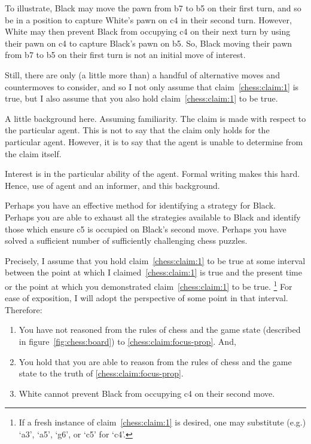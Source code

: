 \documentclass[10pt]{article}
\begin{document}
To illustrate, Black may move the pawn from b7 to b5 on their first turn, and so be in a position to capture White's pawn on c4 in their second turn.
However, White may then prevent Black from occupying c4 on their next turn by using their pawn on c4 to capture Black's pawn on b5.
So, Black moving their pawn from b7 to b5 on their first turn is not an initial move of interest.

Still, there are only (a little more than) a handful of alternative moves and countermoves to consider, and so I not only assume that claim~\ref{chess:claim:1} is true, but I also assume that you also hold claim~\ref{chess:claim:1} to be true.

\begin{note}
  A little background here.
  Assuming familiarity.
  The claim is made with respect to the particular agent.
  This is not to say that the claim only holds for the particular agent.
  However, it is to say that the agent is unable to determine from the claim itself.

  Interest is in the particular ability of the agent.
  Formal writing makes this hard.
  Hence, use of agent and an informer, and this background.
\end{note}

\begin{note}
  Perhaps you have an effective method for identifying a strategy for Black.
  Perhaps you are able to exhaust all the strategies available to Black and identify those which ensure c5 is occupied on Black's second move.
  Perhaps you have solved a sufficient number of sufficiently challenging chess puzzles.
\end{note}

Precisely, I assume that you hold claim~\ref{chess:claim:1} to be true at some interval between the point at which I claimed~\ref{chess:claim:1} is true and the present time or the point at which you demonstrated claim~\ref{chess:claim:1} to be true.\nolinebreak
\footnote{
  If a fresh instance of claim~\ref{chess:claim:1} is desired, one may substitute (e.g.) `a3', `a5', `g6', or `c5' for `c4'.
}
For ease of exposition, I will adopt the perspective of some point in that interval.
Therefore:
\begin{enumerate}[resume]
\item\label{chess:claim:no-reason} You have not reasoned from the rules of chess and the game state (described in figure~\ref{fig:chess:board}) to \ref{chess:claim:focus-prop}. And,
\item\label{chess:claim:able-reason} You hold that you are able to reason from the rules of chess and the game state to the truth of \ref{chess:claim:focus-prop}.
\item\label{chess:claim:focus-prop} White cannot prevent Black from occupying c4 on their second move.
\end{enumerate}
\end{document}
